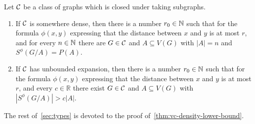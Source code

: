 \begin{theorem}
Let $\mathcal{C}$ be a class of graphs which 
is closed under taking subgraphs. 
\begin{enumerate}[(1)]
\item If $\mathcal{C}$ is somewhere dense, then there is a number $r_0\in\mathbb{N}$ such that for the formula $\phi(x,y)$ expressing that the distance between $x$ and $y$ is at most $r$, and for every $n\in \mathbb{N}$ there are $G\in\mathcal{C}$ and $A\subseteq V(G)$ 
with $|A|=n$ and $S^\phi(G/A)=P(A)$.
\item If $\mathcal{C}$ has unbounded expansion, then there is a number $r_0\in\mathbb{N}$ such that for the formula $\phi(x,y)$ expressing that the distance between $x$ and $y$ is at most $r$, and every $c\in \mathbb{R}$ there exist $G\in\mathcal{C}$ and $A\subseteq V(G)$ with $|S^\phi(G/A)|>c|A|$. 
\end{enumerate}
\end{theorem}
The rest of~\cref{sec:types} is devoted to the proof of~\cref{thm:vc-density-lower-bound}.
